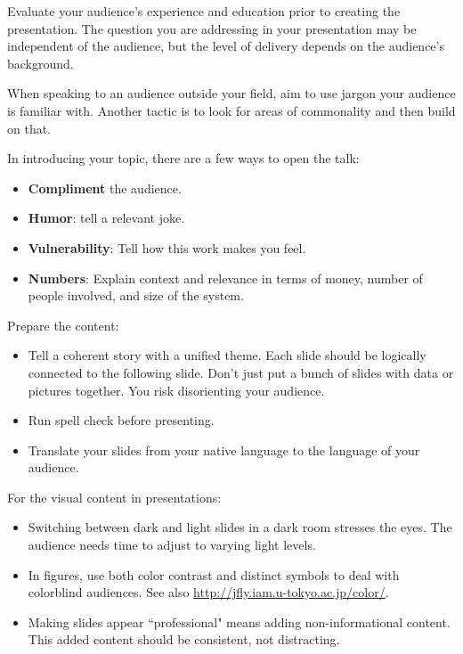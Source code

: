 Evaluate your audience's experience and education prior to creating the presentation. The question you are addressing in your presentation may be independent of the audience, but the level of delivery depends on the audience's background.

When speaking to an audience outside your field, aim to use jargon your audience is familiar with. Another tactic is to look for areas of commonality and then build on that.

In introducing your topic, there are a few ways to open the talk:
\begin{itemize}
    \item \textbf{Compliment} the audience.
    \item \textbf{Humor}: tell a relevant joke.
    \item \textbf{Vulnerability}: Tell how this work makes you feel.
    \item \textbf{Numbers}: Explain context and relevance in terms of money, number of people involved, and size of the system.
\end{itemize}



Prepare the content:
\begin{itemize}
    \item Tell a coherent story with a unified theme. Each slide should be logically connected to the following slide. Don't just put a bunch of slides with data or pictures together. You risk disorienting your audience.
    \item Run spell check before presenting.
    \item Translate your slides from your native language to the language of your audience.
\end{itemize}


For the visual content in presentations:
\begin{itemize}
    \item Switching between dark and light slides in a dark room stresses the eyes. The audience needs time to adjust to varying light levels.
    \item In figures, use both color contrast and distinct symbols to deal with colorblind audiences. See also \href{http://jfly.iam.u-tokyo.ac.jp/color/}{http://jfly.iam.u-tokyo.ac.jp/color/}.
    \item Making slides appear ``professional" means adding non-informational content. This added content should be consistent, not distracting.
\end{itemize}

